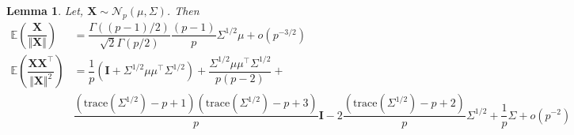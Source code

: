\documentclass[11pt]{article}
\def\E{\mathbb{E}}
\newcommand{\bb}[1]{\boldsymbol{#1}}
\newcommand{\tr}{^{\intercal}}
\newcommand{\normdist}{\mathcal{N}}
\theoremstyle{general}
\newtheorem{lemma}{Lemma}
\numberwithin{equation}{section}
\begin{document}
\begin{lemma}\label{lemma:generic}
    Let, $\bb{X} \sim \normdist_p(\mu, \Sigma)$. Then 
    \begin{align*}
        \E\left( \dfrac{\bb{X} }{\Vert \bb{X} \Vert} \right) & = \dfrac{\Gamma((p-1)/2)}{\sqrt{2}\Gamma(p/2)}\dfrac{(p-1)}{p}\Sigma^{1/2}\mu + o(p^{-3/2})\\
        \E\left( \dfrac{ \bb{X}\bb{X}\tr}{\Vert \bb{X}\Vert^2} \right) & = \dfrac{1}{p}(\bb{I} + \Sigma^{1/2}\mu\mu\tr \Sigma^{1/2}) + \dfrac{\Sigma^{1/2}\mu \mu\tr \Sigma^{1/2}}{p(p-2)} + \\
        & \dfrac{(\text{trace}(\Sigma^{1/2}) - p + 1)(\text{trace}(\Sigma^{1/2}) - p + 3)}{p}\bb{I} - 2\dfrac{(\text{trace}(\Sigma^{1/2}) - p + 2)}{p}\Sigma^{1/2} + \dfrac{1}{p}\Sigma + o(p^{-2})
    \end{align*}
\end{lemma}
\end{document}

